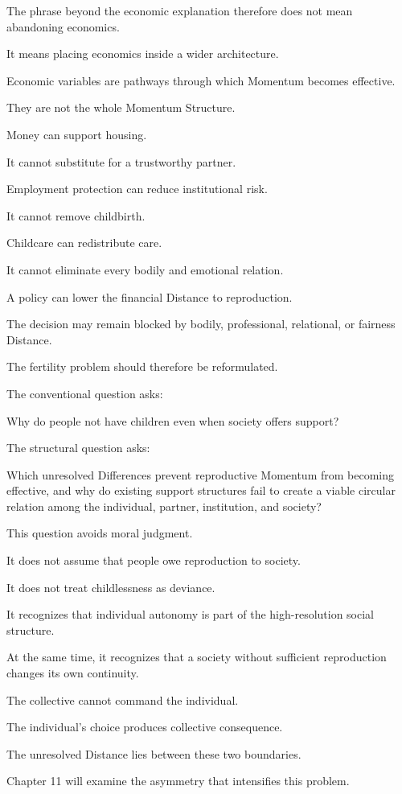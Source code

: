 The phrase beyond the economic explanation therefore does not mean abandoning economics.

It means placing economics inside a wider architecture.

Economic variables are pathways through which Momentum becomes effective.

They are not the whole Momentum Structure.

Money can support housing.

It cannot substitute for a trustworthy partner.

Employment protection can reduce institutional risk.

It cannot remove childbirth.

Childcare can redistribute care.

It cannot eliminate every bodily and emotional relation.

A policy can lower the financial Distance to reproduction.

The decision may remain blocked by bodily, professional, relational, or fairness Distance.

The fertility problem should therefore be reformulated.

The conventional question asks:

Why do people not have children even when society offers support?

The structural question asks:

Which unresolved Differences prevent reproductive Momentum from becoming effective, and why do existing support structures fail to create a viable circular relation among the individual, partner, institution, and society?

This question avoids moral judgment.

It does not assume that people owe reproduction to society.

It does not treat childlessness as deviance.

It recognizes that individual autonomy is part of the high-resolution social structure.

At the same time, it recognizes that a society without sufficient reproduction changes its own continuity.

The collective cannot command the individual.

The individual’s choice produces collective consequence.

The unresolved Distance lies between these two boundaries.

Chapter 11 will examine the asymmetry that intensifies this problem.

